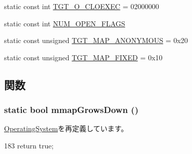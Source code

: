 \begin{DoxyCompactItemize}
\item 
static const int \hyperlink{classX86Linux32_a34aa7ec867a12296e12a851c47fb56d4}{TGT\_\-O\_\-CLOEXEC} = 02000000
\item 
static const int \hyperlink{classX86Linux32_ad85b9918c8f2c8739537a002dc1dc526}{NUM\_\-OPEN\_\-FLAGS}
\item 
static const unsigned \hyperlink{classX86Linux32_a0bbc267200567dd98250b99b6085a499}{TGT\_\-MAP\_\-ANONYMOUS} = 0x20
\item 
static const unsigned \hyperlink{classX86Linux32_a0124e421d7846143bca15728b7a53e14}{TGT\_\-MAP\_\-FIXED} = 0x10
\end{DoxyCompactItemize}


\subsection{関数}
\hypertarget{classX86Linux32_ac6a940551fe72dce1ba4e7b4fa093137}{
\subsubsection[{mmapGrowsDown}]{\setlength{\rightskip}{0pt plus 5cm}static bool mmapGrowsDown ()}}
\label{classX86Linux32_ac6a940551fe72dce1ba4e7b4fa093137}


\hyperlink{classOperatingSystem_ac6a940551fe72dce1ba4e7b4fa093137}{OperatingSystem}を再定義しています。


\begin{DoxyCode}
183 { return true; }
\end{DoxyCode}


